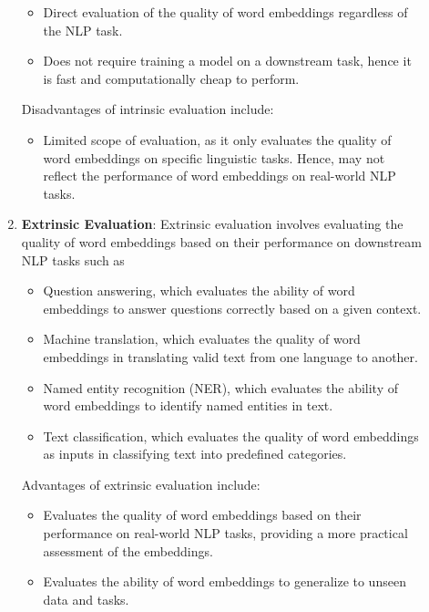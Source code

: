 \documentclass[12pt]{article}
\begin{document}
\begin{description}
\begin{enumerate}
    \begin{itemize}
      \item Direct evaluation of the quality of word embeddings regardless of the NLP task.
      \item Does not require training a model on a downstream task, hence it is fast and computationally cheap to perform.
    \end{itemize}

    Disadvantages of intrinsic evaluation include:

    \begin{itemize}
      \item Limited scope of evaluation, as it only evaluates the quality of word embeddings on specific linguistic tasks. Hence, may not reflect the performance of word 
      embeddings on real-world NLP tasks.
    \end{itemize}

  \item \textbf{Extrinsic Evaluation}: Extrinsic evaluation involves evaluating the quality of word embeddings based on their performance on downstream NLP tasks such as
  
  \begin{itemize}
    \item Question answering, which evaluates the ability of word embeddings to answer questions correctly based on a given context.
    \item Machine translation, which evaluates the quality of word embeddings in translating valid text from one language to another.
    \item Named entity recognition (NER), which evaluates the ability of word embeddings to identify named entities in text.
    \item Text classification, which evaluates the quality of word embeddings as inputs in classifying text into predefined categories.
  \end{itemize}

  Advantages of extrinsic evaluation include:

  \begin{itemize}
    \item Evaluates the quality of word embeddings based on their performance on real-world NLP tasks, providing a more practical assessment of the embeddings.
    \item Evaluates the ability of word embeddings to generalize to unseen data and tasks.
  \end{itemize}


\end{enumerate}
\end{description}
\end{document}
